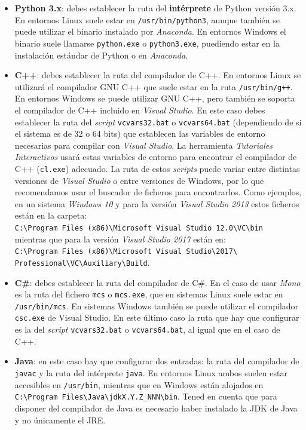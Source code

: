 \documentclass[]{article}
\newcommand{\toolname}{\emph{Tutoriales Interactivos}}
\begin{document}
\begin{itemize}
	\item \textbf{Python 3.x}: debes establecer la ruta del \textbf{intérprete} de Python versión 3.x. En entornos Linux suele estar en \texttt{/usr/bin/python3}, aunque también se puede utilizar el binario instalado por \emph{Anaconda}. En entornos Windows el binario suele llamarse \texttt{python.exe} o \texttt{python3.exe}, puediendo estar en la instalación estándar de Python o en \emph{Anaconda}.
	
	\item \textbf{C++}: debes establecer la ruta del compilador de C++. En entornos Linux se utilizará el compilador GNU C++ que suele estar en la ruta \texttt{/usr/bin/g++}. En entornos Windows se puede utilizar GNU C++, pero también se soporta el compilador de C++ incluido en \emph{Visual Studio}. En este caso debes establecer la ruta del \emph{script} \texttt{vcvars32.bat} o \texttt{vcvars64.bat} (dependiendo de si el sistema es de 32 o 64 bits) que establecen las variables de entorno necesarias para compilar con \emph{Visual Studio}. La herramienta \toolname{} usará estas variables de entorno para encontrar el compilador de C++ (\texttt{cl.exe}) adecuado. La ruta de estos \emph{scripts} puede variar entre distintas versiones de \emph{Visual Studio} o entre versiones de Windows, por lo que recomendamos usar el buscador de ficheros para encontrarlos. Como ejemplos, en un sistema \emph{Windows 10} y para la versión \emph{Visual Studio 2013} estos ficheros están en la carpeta: \\[0.2cm]
	\texttt{C:\textbackslash Program Files (x86)\textbackslash Microsoft Visual Studio 12.0\textbackslash VC\textbackslash bin}\\[0.2cm]
	mientras que para la versión \emph{Visual Studio 2017} están en:\\[0.2cm]
	\texttt{C:\textbackslash Program Files (x86)\textbackslash Microsoft Visual Studio\textbackslash 2017\textbackslash \\%
		Professional\textbackslash VC\textbackslash Auxiliary\textbackslash Build}.
	\item \textbf{C\#}: debes establecer la ruta del compilador de C\#. En el caso de usar \emph{Mono} es la ruta del fichero \texttt{mcs} o \texttt{mcs.exe}, que en sistemas Linux suele estar en \texttt{/usr/bin/mcs}. En sistemas Windows también se puede utilizar el compilador \texttt{csc.exe} de Visual Studio. En este último caso la ruta que hay que configurar es la del \emph{script} \texttt{vcvars32.bat} o \texttt{vcvars64.bat}, al igual que en el caso de C++.
	\item \textbf{Java}: en este caso hay que configurar dos entradas: la ruta del compilador de \texttt{javac} y la ruta del intérprete \texttt{java}. En entornos Linux ambos suelen estar accesibles en \texttt{/usr/bin}, mientras que en Windows están alojados en \texttt{C:\textbackslash Program Files\textbackslash Java\textbackslash jdkX.Y.Z\_NNN\textbackslash bin}. Tened en cuenta que para disponer del compilador de Java es necesario haber instalado la JDK de Java y no únicamente el JRE.
\end{itemize}
\end{document}
